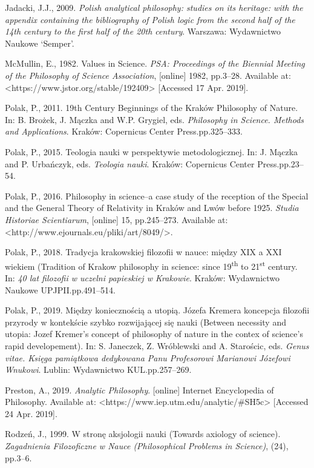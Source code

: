 \documentclass[a4paper]{article}
\begin{document}
Jadacki, J.J., 2009. \textit{Polish analytical philosophy: studies on its heritage: with the appendix containing the
bibliography of Polish logic from the second half of the 14th century to the first half of the 20th century}. Warszawa:
Wydawnictwo Naukowe ‘Semper’.

McMullin, E., 1982. Values in Science. \textit{PSA: Proceedings of the Biennial Meeting of the Philosophy of Science
Association}, [online] 1982, pp.3–28. Available at: {\textless}https://www.jstor.org/stable/192409{\textgreater}
[Accessed 17 Apr. 2019].

Polak, P., 2011. 19th Century Beginnings of the Kraków Philosophy of Nature. In: B. Brożek, J. Mączka and W.P. Grygiel,
eds. \textit{Philosophy in Science. Methods and Applications}. Kraków: Copernicus Center Press.pp.325–333.

Polak, P., 2015. Teologia nauki w perspektywie metodologicznej. In: J. Mączka and P. Urbańczyk, eds. \textit{Teologia
nauki}. Kraków: Copernicus Center Press.pp.23–54.

Polak, P., 2016. Philosophy in science–a case study of the reception of the Special and the General Theory of Relativity
in Kraków and Lwów before 1925. \textit{Studia Historiae Scientiarum}, [online] 15, pp.245–273. Available at:
{\textless}http://www.ejournals.eu/pliki/art/8049/{\textgreater}.

Polak, P., 2018. Tradycja krakowskiej filozofii w nauce: między XIX a XXI wiekiem (Tradition of Krakow philosophy in
science: since 19\textsuperscript{th} to 21\textsuperscript{st}  century. In: \textit{40 lat filozofii w uczelni
papieskiej w Krakowie}. Kraków: Wydawnictwo Naukowe UPJPII.pp.491–514.

Polak, P., 2019. Między koniecznością a utopią. Józefa Kremera koncepcja filozofii przyrody w kontekście szybko
rozwijającej się nauki (Between necessity and utopia: Jozef Kremer’s concept of philosophy of nature in the contex of
science’s rapid developement). In: S. Janeczek, Z. Wróblewski and A. Starościc, eds. \textit{Genus vitae. Księga
pamiątkowa dedykowana Panu Profesorowi Marianowi Józefowi Wnukowi}. Lublin: Wydawnictwo KUL.pp.257–269.

Preston, A., 2019. \textit{Analytic Philosophy}. [online] Internet Encyclopedia of Philosophy. Available at:
{\textless}https://www.iep.utm.edu/analytic/\#SH5c{\textgreater} [Accessed 24 Apr. 2019].

Rodzeń, J., 1999. W stronę aksjologii nauki (Towards axiology of science). \textit{Zagadnienia Filozoficzne w Nauce
(Philosophical Problems in Science)}, (24), pp.3–6.
\end{document}
